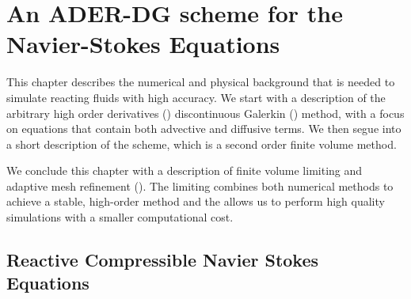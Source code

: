\chapter{An ADER-DG scheme for the Navier-Stokes Equations}\label{chap:methods}
This chapter describes the numerical and physical background that is needed to simulate reacting fluids with high accuracy.
We start with a description of the arbitrary high order derivatives (\ader{}) discontinuous Galerkin (\dg{}) method, with a focus on equations that contain both advective and diffusive terms.
We then segue into a short description of the \muscl{} scheme, which is a second order finite volume method.

We conclude this chapter with a description of finite volume limiting and adaptive mesh refinement (\amr{}).
The limiting combines both numerical methods to achieve a stable, high-order method and the \amr{} allows us to perform high quality simulations with a smaller computational cost.
\section{Reactive Compressible Navier Stokes Equations}\label{sec:navier-stokes}
\newcommand{\diffCoeff}{\varepsilon}
\newcommand{\hyperFluxDef}{
  \begin{pmatrix}
    \Qj \\
    \Qv  \otimes \Qj + \bm{I} \pressure  \\
    \Qv \cdot (\bm{I} \QE + \bm{I} \pressure) \\
    \Qj \QZZ
  \end{pmatrix}
}
\newcommand{\viscFluxDef}{
  \begin{pmatrix}
    0\\
     \stressT (\Q, \gradQ)  \\
     \Qv \cdot \stressT (\Q, \gradQ) - \kappa \gradient{T}\\
     0\\
   \end{pmatrix}
}

